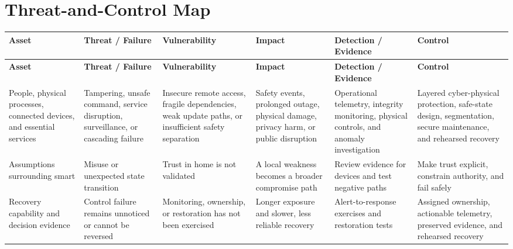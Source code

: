 \documentclass[11pt]{article}
\begin{document}
\section*{Threat-and-Control Map}
\begingroup\scriptsize\setlength{\tabcolsep}{2pt}
\begin{longtable}{>{\RaggedRight\arraybackslash}p{}>{\RaggedRight\arraybackslash}p{}>{\RaggedRight\arraybackslash}p{}>{\RaggedRight\arraybackslash}p{}>{\RaggedRight\arraybackslash}p{}>{\RaggedRight\arraybackslash}p{}}
\toprule\rowcolor{Navy}\color{white}\textbf{Asset} & \color{white}\textbf{Threat / Failure} & \color{white}\textbf{Vulnerability} & \color{white}\textbf{Impact} & \color{white}\textbf{Detection / Evidence} & \color{white}\textbf{Control}\\\midrule
\endfirsthead
\toprule\rowcolor{Navy}\color{white}\textbf{Asset} & \color{white}\textbf{Threat / Failure} & \color{white}\textbf{Vulnerability} & \color{white}\textbf{Impact} & \color{white}\textbf{Detection / Evidence} & \color{white}\textbf{Control}\\\midrule
\endhead
People, physical processes, connected devices, and essential services & Tampering, unsafe command, service disruption, surveillance, or cascading failure & Insecure remote access, fragile dependencies, weak update paths, or insufficient safety separation & Safety events, prolonged outage, physical damage, privacy harm, or public disruption & Operational telemetry, integrity monitoring, physical controls, and anomaly investigation & Layered cyber-physical protection, safe-state design, segmentation, secure maintenance, and rehearsed recovery\\\midrule
Assumptions surrounding smart & Misuse or unexpected state transition & Trust in home is not validated & A local weakness becomes a broader compromise path & Review evidence for devices and test negative paths & Make trust explicit, constrain authority, and fail safely\\\midrule
Recovery capability and decision evidence & Control failure remains unnoticed or cannot be reversed & Monitoring, ownership, or restoration has not been exercised & Longer exposure and slower, less reliable recovery & Alert-to-response exercises and restoration tests & Assigned ownership, actionable telemetry, preserved evidence, and rehearsed recovery\\\midrule
\bottomrule
\end{longtable}
\endgroup
\end{document}
